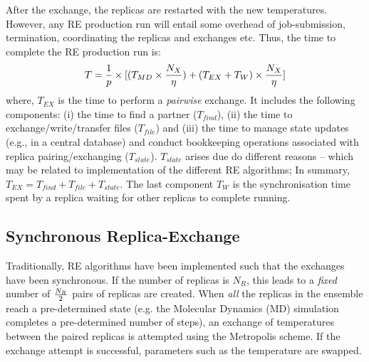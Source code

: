 \documentclass{rspublic}
\newcommand{\alnote}[1]{ {\textcolor{blue} { ***andre: #1 }}}
\newcommand{\athotanote}[1]{ {\textcolor{green} { ***athota: #1 }}}
\newcommand{\alnote}[1]{}
\newcommand{\athotanote}[1]{}
\begin{document}
After the exchange, the replicas are restarted with the new temperatures. 
However, any RE production run will
entail some overhead  of job-submission, termination, coordinating the replicas and exchanges
etc. Thus, the time to complete the RE production run is:
\begin{eqnarray}
  T = {1\over p} \times [(T_{MD} \times  {N_X \over {\eta}}) +
  {(T_{EX} + T_{W})} \times {N_X \over \eta}]
\label{eq:totaltime}
\end{eqnarray}
where, $T_{EX}$ is the time to perform a {\it pairwise} exchange. It
includes the following components: (i) the time to find a partner ($T_{find}$),
(ii) the time to exchange/write/transfer files ($T_{file}$) and (iii) the time 
to manage state updates  (e.g., in a central database) and conduct bookkeeping
operations associated with replica pairing/exchanging ($T_{state}$). $T_{state}$ 
arises due do different reasons -- which may be related to
implementation %
of the different RE algorithms; In summary, $T_{EX} = T_{find} + T_{file}+T_{state}$. The
last component $T_W$ is the synchronisation
time spent by a replica waiting for other replicas to complete running.



\subsection{Synchronous Replica-Exchange}

Traditionally, RE algorithms have been implemented such that the
exchanges have been synchronous.  If the number of replicas is
${N_R}$, this leads to a {\it fixed} number of ${N_R \over 2}$ pairs
of replicas are created.  When \emph{all} the replicas in the ensemble
reach a pre-determined state (e.g. the Molecular Dynamics (MD)
simulation completes a pre-determined number of steps), an exchange of
temperatures between the paired replicas is attempted using the
Metropolis scheme.  If the exchange attempt is successful, parameters
such as the temperature are swapped.
\end{document}
